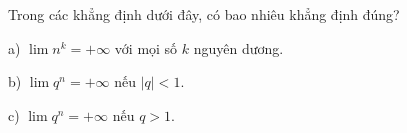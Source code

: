 \begin{ex}
Trong các khẳng định dưới đây, có bao nhiêu khẳng định đúng?

a) $\lim n^k=+\infty$ với mọi số $k$ nguyên dương.

b) $\lim q^n=+\infty$ nếu $|q|<1$.

c) $\lim q^n=+\infty$ nếu $q>1$.
\end{ex}
